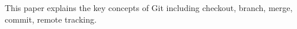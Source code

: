 This paper explains the key concepts of Git including checkout, branch, merge, commit, remote tracking.